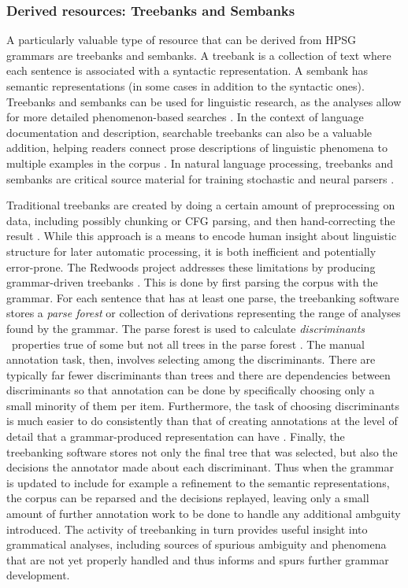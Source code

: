 \documentclass[output=paper,nonflat]{langsci/langscibook}
\begin{document}
\subsubsection{Derived resources: Treebanks and Sembanks}
\label{cl:treebanks}

A particularly valuable type of resource that can be derived from HPSG
grammars are treebanks and sembanks. A treebank is a collection of
text where each sentence is associated with a syntactic
representation. A sembank has semantic representations (in some cases
in addition to the syntactic ones). Treebanks and sembanks can be used
for linguistic research, as the analyses allow for more detailed
phenomenon-based searches \citep{FIXME-tgrep,FIXME-fangorn}. In the
context of language documentation and description, searchable
treebanks can also be a valuable addition, helping readers connect
prose descriptions of linguistic phenomena to multiple examples in the
corpus \citep{Ben:Gho:Bal:Dri:12}. In natural language processing,
treebanks and sembanks are critical source material for training
stochastic and neural parsers \citep{FIXME}.

Traditional treebanks are created by doing a certain amount of
preprocessing on data, including possibly chunking or CFG parsing, and
then hand-correcting the result \citep{FIXME-PTB,FIXME-AMR}. While this
approach is a means to encode human insight about linguistic structure
for later automatic processing, it is both inefficient and potentially
error-prone. The Redwoods project addresses these limitations by
producing grammar-driven treebanks \citep{OFTM2004a-u}. This is done by
first parsing the corpus with the grammar. For each sentence that has
at least one parse, the treebanking software stores a \emph{parse
  forest} or collection of derivations representing the range of
analyses found by the grammar. The parse forest is used to calculate
\emph{discriminants} \ie\ properties true of some but not all trees in
the parse forest \citep{Carter:97}. The manual annotation task, then,
involves selecting among the discriminants. There are typically far
fewer discriminants than trees and there are dependencies between
discriminants so that annotation can be done by specifically choosing
only a small minority of them per item. Furthermore, the task of
choosing discriminants is much easier to do consistently than that of
creating annotations at the level of detail that a grammar-produced
representation can have \citep{Bender2015LayersOI}. Finally, the
treebanking software stores not only the final tree that was selected,
but also the decisions the annotator made about each
discriminant. Thus when the grammar is updated to include for example
a refinement to the semantic representations, the corpus can be
reparsed and the decisions replayed, leaving only a small amount of
further annotation work to be done to handle any additional ambguity
introduced. The activity of treebanking in turn provides useful
insight into grammatical analyses, including sources of spurious
ambiguity and phenomena that are not yet properly handled and thus
informs and spurs further grammar development.
\end{document}
